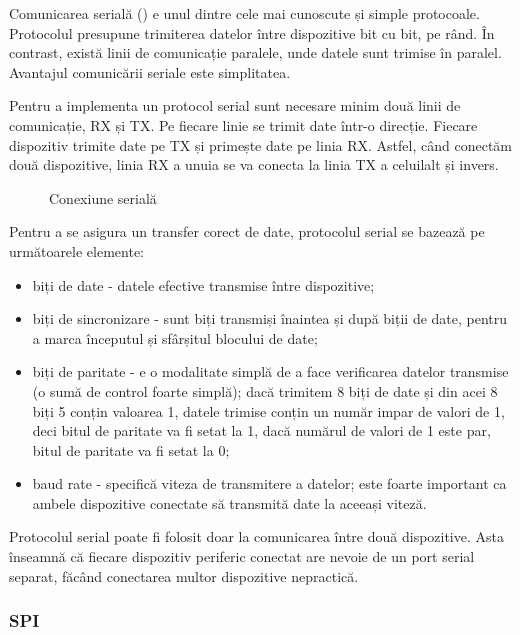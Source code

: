 Comunicarea serială () e unul dintre cele mai cunoscute și simple protocoale.
Protocolul presupune trimiterea datelor între dispozitive bit cu bit, pe rând.
În contrast, există linii de comunicație paralele, unde datele sunt trimise în
paralel. Avantajul comunicării seriale este simplitatea.

Pentru a implementa un protocol serial sunt necesare minim două linii de
comunicație, RX și TX. Pe fiecare linie se trimit date într-o direcție. Fiecare
dispozitiv trimite date pe TX și primește date pe linia RX. Astfel, când
conectăm două dispozitive, linia RX a unuia se va conecta la linia TX a
celuilalt și invers.

\begin{figure}[htbp]
  \centering
  \def\svgwidth{\columnwidth}
  
  \caption{Conexiune serială}
  \label{fig:embed:serial}
\end{figure}

Pentru a se asigura un transfer corect de date, protocolul serial se bazează pe
următoarele elemente:

\begin{itemize}
  \item biți de date - datele efective transmise între dispozitive;
  \item biți de sincronizare - sunt biți transmiși înaintea și după biții
    de date, pentru a marca începutul și sfârșitul blocului de date;
  \item biți de paritate - e o modalitate simplă de a face verificarea
    datelor transmise (o sumă de control foarte simplă); dacă trimitem 8
    biți de date și din acei 8 biți 5 conțin valoarea 1, datele
    trimise conțin un număr impar de valori de 1, deci bitul de
    paritate va fi setat la 1, dacă numărul de valori de 1 este par,
    bitul de paritate va fi setat la 0;
  \item baud rate - specifică viteza de transmitere a datelor; este foarte
    important ca ambele dispozitive conectate să transmită date la
    aceeași viteză.
\end{itemize}

Protocolul serial poate fi folosit doar la comunicarea între două dispozitive.
Asta înseamnă că fiecare dispozitiv periferic conectat are nevoie de un port
serial separat, făcând conectarea multor dispozitive nepractică.

\subsubsection{SPI}
\label{sec:embed:bus:wired:spi}

